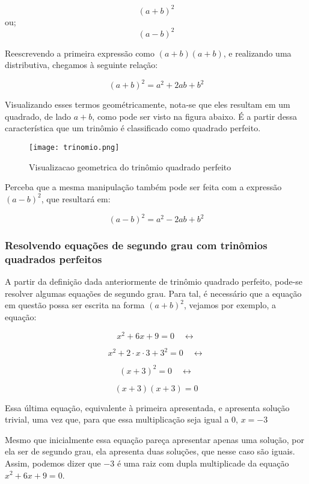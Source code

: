 \documentclass[../resumo.tex]{subfiles}
\begin{document}
	\[(a + b)^2\]
	ou;
	\[(a - b)^2\]

	Reescrevendo a primeira expressão como \((a + b)(a + b)\), e realizando uma distributiva, chegamos
	à seguinte relação:

	\[(a + b)^2 = a^2 + 2ab + b^2\]
	

	Visualizando esses termos geométricamente, nota-se que eles resultam em um quadrado,
	de lado \(a + b\), como pode ser visto na figura abaixo. É a partir dessa característica
	que um trinômio é classificado como quadrado perfeito.

	\begin{figure}[H]
		\centering
		\texttt{[image: trinomio.png]}
		\caption{Visualizacao geometrica do trinômio quadrado perfeito}
		\label{fig:Figura 1.1}

	\end{figure}

	Perceba que a mesma manipulação também pode ser feita com a expressão \((a - b)^2\), que resultará em:

	\[(a - b)^2 = a^2 - 2ab + b^2\]


	\subsubsection{Resolvendo equações de segundo grau com trinômios quadrados perfeitos}

	A partir da definição dada anteriormente de trinômio quadrado perfeito, pode-se resolver
	algumas equações de segundo grau. Para tal, é necessário que a equação em questão possa ser escrita
	na forma \((a + b)^2\), vejamos por exemplo, a equação:
	
	\[x^2 + 6x + 9 = 0 \quad \leftrightarrow\]

	\[x^2 + 2\cdot x\cdot3 + 3^2 = 0 \quad \leftrightarrow\]

	\[(x + 3)^2 = 0 \quad \leftrightarrow\]

	\[(x + 3)(x + 3) = 0\]

	Essa última equação, equivalente à primeira apresentada, e apresenta solução trivial, uma vez que, para que
	essa multiplicação seja igual a 0, \(x = -3\)

	Mesmo que inicialmente essa equação pareça apresentar apenas uma solução,
	por ela ser de segundo grau, ela apresenta duas soluções, que nesse caso são iguais. Assim, podemos dizer
	que $-3$ é uma raiz com dupla multiplicade da equação \(x^2 + 6x + 9 = 0\).
\end{document}

